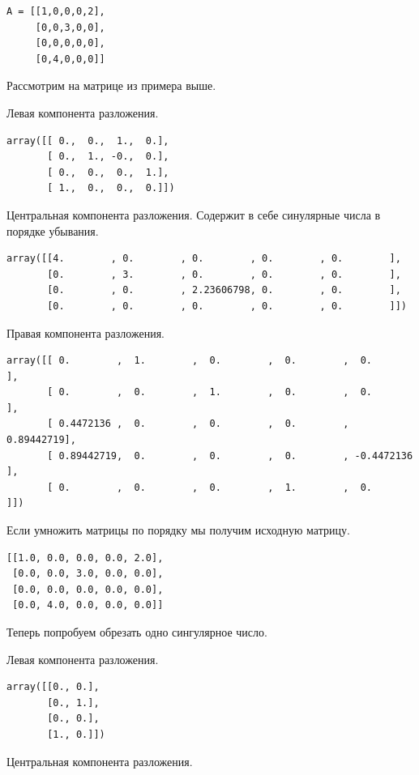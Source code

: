 \documentclass[pdf, unicode, 12pt, a4paper,oneside,fleqn]{article}
\begin{document}
\begin{lstlisting}
A = [[1,0,0,0,2],
     [0,0,3,0,0],
     [0,0,0,0,0],
     [0,4,0,0,0]]
\end{lstlisting}

Рассмотрим на матрице из примера выше.

Левая компонента разложения.

\begin{lstlisting}
array([[ 0.,  0.,  1.,  0.],
       [ 0.,  1., -0.,  0.],
       [ 0.,  0.,  0.,  1.],
       [ 1.,  0.,  0.,  0.]])
\end{lstlisting}

Центральная компонента разложения. Содержит в себе синулярные числа в порядке убывания.

\begin{lstlisting}
array([[4.        , 0.        , 0.        , 0.        , 0.        ],
       [0.        , 3.        , 0.        , 0.        , 0.        ],
       [0.        , 0.        , 2.23606798, 0.        , 0.        ],
       [0.        , 0.        , 0.        , 0.        , 0.        ]])
\end{lstlisting}

Правая компонента разложения.

\begin{lstlisting}
array([[ 0.        ,  1.        ,  0.        ,  0.        ,  0.        ],
       [ 0.        ,  0.        ,  1.        ,  0.        ,  0.        ],
       [ 0.4472136 ,  0.        ,  0.        ,  0.        ,  0.89442719],
       [ 0.89442719,  0.        ,  0.        ,  0.        , -0.4472136 ],
       [ 0.        ,  0.        ,  0.        ,  1.        ,  0.        ]])
\end{lstlisting}

Если умножить матрицы по порядку мы получим исходную матрицу.

\begin{lstlisting}
[[1.0, 0.0, 0.0, 0.0, 2.0],
 [0.0, 0.0, 3.0, 0.0, 0.0],
 [0.0, 0.0, 0.0, 0.0, 0.0],
 [0.0, 4.0, 0.0, 0.0, 0.0]]
\end{lstlisting}

Теперь попробуем обрезать одно сингулярное число.

Левая компонента разложения.

\begin{lstlisting}
array([[0., 0.],
       [0., 1.],
       [0., 0.],
       [1., 0.]])
\end{lstlisting}

Центральная компонента разложения.
\end{document}

